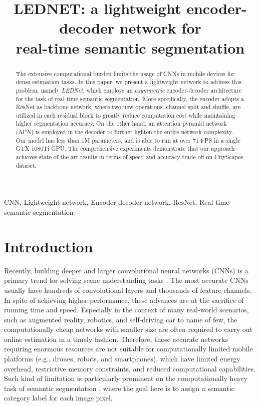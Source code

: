 \documentclass{article}
\title{LEDNET: a lightweight encoder-decoder network for \\ real-time semantic segmentation}
\begin{document}
\maketitle
\begin{abstract}

The extensive computational burden limits the usage of CNNs in mobile devices for dense estimation tasks. In this paper, we present a lightweight network to address this problem, namely \emph{LEDNet}, which employs an \emph{asymmetric} encoder-decoder architecture for the task of real-time semantic segmentation. More specifically, the encoder adopts a ResNet as backbone network, where two new operations, channel split and shuffle, are utilized in each residual block to greatly reduce computation cost while maintaining higher segmentation accuracy. On the other hand, an attention pyramid network (APN) is employed in the decoder to further lighten the entire network complexity. Our model has less than 1M parameters, and is able to run at over 71 FPS in a single GTX 1080Ti GPU. The comprehensive experiments demonstrate that our approach achieves state-of-the-art results in terms of speed and accuracy trade-off on CityScapes dataset.

\end{abstract}
\begin{keywords}
CNN, Lightweight network, Encoder-decoder network, ResNet, Real-time semantic segmentation
\end{keywords}
\section{Introduction}
\label{sec:intro}

Recently, building deeper and larger convolutional neural networks (CNNs) is a primary trend for solving scene understanding tasks \cite{Girshick2014rich,He2016deep,going2015szegedy,long2017fully,Chen2016deeplab}. The most accurate CNNs usually have hundreds of convolutional layers and thousands of feature channels. In spite of achieving higher performance, these advances are at the sacrifice of running time and speed. Especially in the context of many real-world scenarios, such as augmented reality, robotics, and self-driving car to name of few, the computationally cheap networks with smaller size are often required to carry out online estimation in a timely fashion. Therefore, those accurate networks requiring enormous resources are not suitable for computationally limited mobile platforms (e.g., drones, robots, and smartphones), which have limited energy overhead, restrictive memory constraints, and reduced computational capabilities. Such kind of limitation is particularly prominent on the computationally heavy task of semantic segmentation \cite{long2017fully,Chen2016deeplab,Guosheng2017RefineNet,Badrinarayanan2015Segnet,zhao2017pyramid}, where the goal here is to assign a semantic category label for each image pixel.
\end{document}
